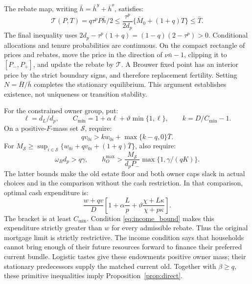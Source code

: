 \documentclass[11pt]{article}
\begin{document}
The rebate map, writing $\bar h=\bar h^y+\bar h^o$, satisfies:
\begin{equation}
\mathcal T(P,T)=q\tau^pP\bar h/2
\le\frac{\tau^p}{2d_p}\{\bar M_0+(1+q)T\}\le\bar T.
\end{equation}
The final inequality uses
$2d_p-\tau^p(1+q)=(1-q)(2-\tau^p)>0$.
Conditional allocations and tenure probabilities are continuous. On the
compact rectangle of prices and rebates, move the price in the direction of
$\nu\bar n-1$, clipping it to $[P_-,P_+]$, and update the rebate by
$\mathcal T$. A Brouwer fixed point has an interior price by the strict
boundary signs, and therefore replacement fertility. Setting
$N=\bar H/\bar h$ completes the stationary equilibrium. This argument
establishes existence, not uniqueness or transition stability.

For the constrained owner group, put:
\begin{equation}
\ell=d_L/d_p,\qquad C_{\min}=1+\alpha\ell+
\vartheta\min\{1,\ell\},\qquad k=D/C_{\min}-1.
\end{equation}
On a positive-$F$-mass set $\mathcal S$, require:
\begin{equation}
qv_{0i}>kw_{0i}+\max\{k-q,0\}\bar T.
\label{eq:income_bound}
\end{equation}
For $M_{\mathcal S}\ge\sup_{i\in\mathcal S}
\{w_{0i}+qv_{0i}+(1+q)\bar T\}$, also require:
\begin{equation}
\omega_Bd_p>q\gamma,\qquad
h_O^{\max}>\frac{M_{\mathcal S}}{d_pP_-}
\max\{1,\gamma/(qK)\}.
\label{eq:cap_bound}
\end{equation}
The latter bounds make the old estate floor and both owner caps slack in
actual choices and in the comparison without the cash restriction.
In that comparison, optimal cash expenditure is:
\begin{equation}
\frac{w+qv}{D}\left[1+\alpha\frac Lp+
\vartheta\frac{\chi+L\kappa}{\chi+p\kappa}\right].
\end{equation}
The bracket is at least $C_{\min}$. Condition \eqref{eq:income_bound} makes
this expenditure strictly greater than $w$ for every admissible rebate.
Thus the original mortgage limit is strictly restrictive. The income
condition says that households cannot bring enough of their future resources
forward to finance their preferred current bundle. Logistic tastes give
these endowments positive owner mass; their stationary predecessors supply
the matched current old. Together with $\beta\ge q$, these primitive
inequalities imply Proposition~\ref{prop:direct}.
\end{document}

